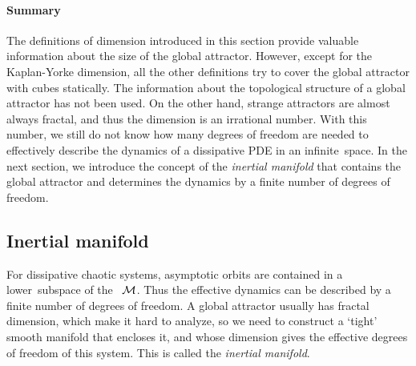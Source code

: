 \paragraph{Summary}
The definitions of dimension introduced in this section provide valuable
information about the size of the global attractor. However,
except for the Kaplan-Yorke dimension, all the other definitions
try to cover the global attractor with cubes statically. The information
about the topological structure of a global attractor has not been
used. On the other hand, strange attractors are almost always
fractal, and thus the dimension is an irrational number.
With this number, we
still do not know how many degrees of freedom are
needed to effectively describe the dynamics of a dissipative PDE in an
infinite\dmn\ space. In the next section, we introduce the concept of the
\emph{inertial manifold} that contains the global attractor and determines
the dynamics by a finite number of degrees of freedom.


\subsection{Inertial manifold}
\label{subsec:IM}

For dissipative chaotic systems, asymptotic orbits are contained in a
lower\dmn\ subspace of
the \statesp\ $\mathcal{M}$. Thus the effective dynamics can be described by a
finite number of degrees of freedom.
A global attractor usually has fractal dimension, which make it hard to
analyze, so we need to construct
a `tight' smooth manifold that encloses it, and whose dimension gives the
effective degrees of freedom of this system. This
is called the \emph{inertial manifold}.

